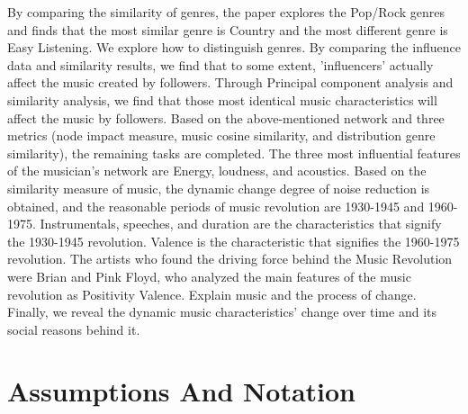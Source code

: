\documentclass[conference]{IEEEtran}
\begin{document}
 By comparing the similarity of genres, the paper explores the Pop/Rock genres and finds that the most similar genre is Country and the most different genre is Easy Listening. We explore how to distinguish genres. By comparing the influence data and similarity results, we find that to some extent, 'influencers' actually affect the music created by followers. Through Principal component analysis and similarity analysis, we find that those most identical music characteristics will affect the music by followers. Based on the above-mentioned network and three metrics (node impact measure, music cosine similarity, and distribution genre similarity), the remaining tasks are completed. The three most influential features of the musician's network are Energy, loudness, and acoustics. Based on the similarity measure of music, the dynamic change degree of noise reduction is obtained, and the reasonable periods of music revolution are 1930-1945 and 1960-1975. Instrumentals, speeches, and duration are the characteristics that signify the 1930-1945 revolution. Valence is the characteristic that signifies the 1960-1975 revolution. The artists who found the driving force behind the Music Revolution were Brian and Pink Floyd, who analyzed the main features of the music revolution as Positivity Valence. Explain music and the process of change. Finally, we reveal the dynamic music characteristics' change over time and its social reasons behind it.

\section{Assumptions And Notation}
\end{document}
